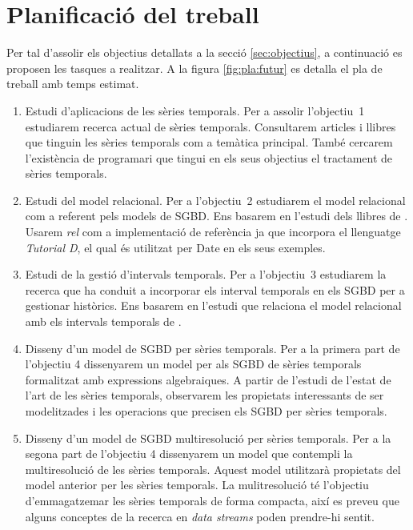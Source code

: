 \section{Planificació del treball}


Per tal d'assolir els objectius detallats a la secció
\ref{sec:objectius}, a continuació es proposen les tasques a
realitzar.  A la figura \ref{fig:pla:futur} es detalla el pla de
treball amb temps estimat.





\begin{enumerate}


\item Estudi d'aplicacions de les sèries temporals. Per a assolir
  l'objectiu~1 estudiarem recerca actual de sèries temporals.
  Consultarem articles i llibres que tinguin les sèries temporals com
  a temàtica principal. També cercarem l'existència de programari que
  tingui en els seus objectius el tractament de sèries temporals.

\item Estudi del model relacional. Per a l'objectiu~2 estudiarem el
  model relacional com a referent pels models de SGBD. Ens basarem en
  l'estudi dels llibres de
  \textcite{date:introduction,date06,date:dictionary}. Usarem
  \emph{rel} \parencite{rel} com a implementació de referència ja que
  incorpora el llenguatge \emph{Tutorial D}, el qual és utilitzat per
  Date en els seus exemples.

\item Estudi de la gestió d'intervals temporals. Per a l'objectiu~3
  estudiarem la recerca que ha conduit a incorporar els interval
  temporals en els SGBD per a gestionar històrics. Ens basarem en
  l'estudi que relaciona el model relacional amb els intervals
  temporals de \textcite{date02:_tempor_data_relat_model}.

\item Disseny d'un model de SGBD per sèries temporals. Per a la
  primera part de l'objectiu 4 dissenyarem un model per als SGBD de
  sèries temporals formalitzat amb expressions algebraiques. A partir
  de l'estudi de l'estat de l'art de les sèries temporals, observarem
  les propietats interessants de ser modelitzades i les operacions que
  precisen els SGBD per sèries temporals.

\item Disseny d'un model de SGBD multiresolució per sèries
  temporals. Per a la segona part de l'objectiu 4 dissenyarem un model
  que contempli la multiresolució de les sèries temporals. Aquest
  model utilitzarà propietats del model anterior per les sèries
  temporals. La mulitresolució té l'objectiu d'emmagatzemar les sèries
  temporals de forma compacta, així es preveu que alguns conceptes de la recerca
  en \emph{data streams} poden prendre-hi sentit.


\end{enumerate}
